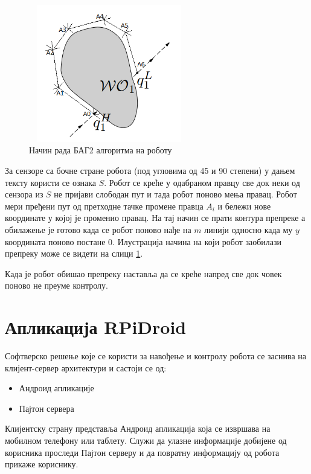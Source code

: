\documentclass[12pt,oneside]{memoir}
\theoremstyle{remark}
\begin{document}
\begin{figure}[!ht]
\centering
\includegraphics[width=7cm, height=6cm]{slike/adapt_bug.png}
\caption{Начин рада БАГ2 алгоритма на роботу}
\label{fig:bugadapt}
\end{figure}

За сензоре са бочне стране робота (под угловима од 45 и 90 степени) у дањем тексту користи се ознака $S$. Робот се креће у одабраном правцу све док неки од сензора из $S$ не пријави слободан пут и тада робот поново мења правац. Робот мери пређени пут од претходне тачке промене правца $A_{i}$ и бележи нове координате у којој је променио правац. На тај начин се прати контура препреке а обилажење је готово када се робот поново нађе на $m$ линији односно када му $y$ координата поново постане 0. Илустрација начина на који робот заобилази препреку може се видети на слици  \ref{fig:bugadapt}.

Када је робот обишао препреку наставља да се креће напред све док човек поново не преуме контролу.


\chapter{Апликација RPiDroid}
\label{chp:aplikacija}
Софтверско решење које се користи за навођење и контролу робота се заснива на клијент-сервер архитектури и састоји се од:
\begin{itemize}
\item Андроид апликације
\item Пајтон сервера
\end{itemize}

Клијентску страну представља Андроид апликација која се извршава на мобилном телефону или таблету. Служи да улазне информације добијене од корисника проследи Пајтон серверу и да повратну информацију од робота прикаже кориснику.
\end{document}
